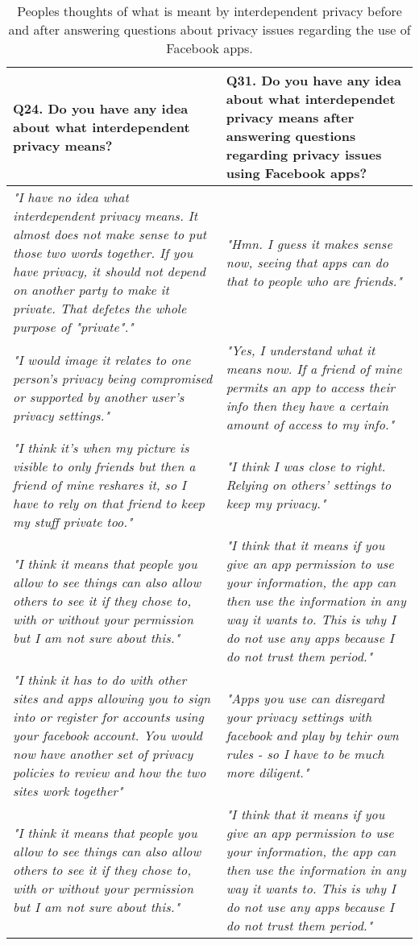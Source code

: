 \begin{center}
\begin{longtable}{ | p{6cm} | p{6cm} |}
    \caption{\label{tab:thoughtonintpriv}Peoples thoughts of what is meant by interdependent privacy before and after answering questions about privacy issues regarding the use of Facebook apps.} \\
    \hline
\textbf{Q24. Do you have any idea about what interdependent privacy means?} & \textbf{Q31. Do you have any idea about what interdependet privacy means after answering questions regarding privacy issues using Facebook apps?} \\ 
\hline
\textit{"I have no idea what interdependent privacy means. It almost does not make sense to put those two words together. If you have privacy, it should not depend on another party to make it private. That defetes the whole purpose of "private"."} &  \textit{"Hmn. I guess it makes sense now, seeing that apps can do that to people who are friends."}\\ 
    \hline
\textit{"I would image it relates to one person's privacy being compromised or supported by another user's privacy settings."} & \textit{"Yes, I understand what it means now. If a friend of mine permits an app to access their info then they have a certain amount of access to my info."}\\ 
    \hline
\textit{"I think it's when my picture is visible to only friends but then a friend of mine reshares it, so I have to rely on that friend to keep my stuff private too."} &  \textit{"I think I was close to right. Relying on others' settings to keep my privacy."}\\ 
    \hline
\textit{"I think it means that people you allow to see things can also allow others to see it if they chose to, with or without your permission but I am not sure about this."} & \textit{"I think that it means if you give an app permission to use your information, the app can then use the information in any way it wants to. This is why I do not use any apps because I do not trust them period."}\\
    \hline
\textit{"I think it has to do with other sites and apps allowing you to sign into or register for accounts using your facebook account.  You would now have another set of privacy policies to review and how the two sites work together"} & \textit{"Apps you use can disregard your privacy settings with facebook and play by tehir own rules - so I have to be much more diligent."}\\
	\hline
\textit{"I think it means that people you allow to see things can also allow others to see it if they chose to, with or without your permission but I am not sure about this."} & \textit{"I think that it means if you give an app permission to use your information, the app can then use the information in any way it wants to. This is why I do not use any apps because I do not trust them period."}\\

\end{longtable}
\end{center}
